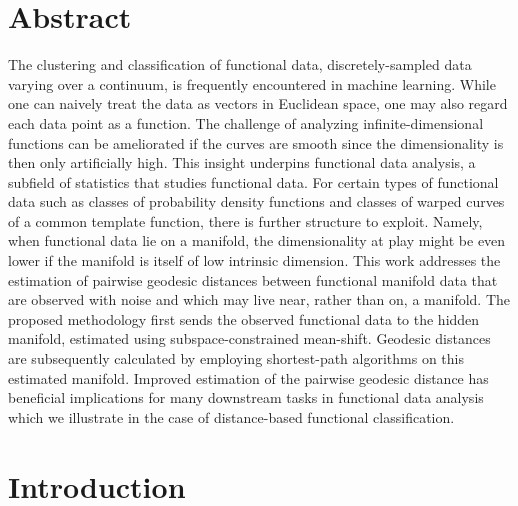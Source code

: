 \newcommand {\To}{\rightarrow}
\newcommand {\TO}{\Rightarrow}
\newcommand {\R}{\mathbb{R}}
\newcommand {\Prob}{\mathbb{P}}
\newcommand{\E}{\mathbb{E}}
\newcommand {\cov}{\textrm{Cov}}
\newcommand {\var}{\textrm{Var}}
\newcommand {\1}{\textrm{\textbf{1}}}
\newcommand{\M}{\mathcal{M}}

\section{Abstract}\label{abstract}

The clustering and classification of functional data, discretely-sampled
data varying over a continuum, is frequently encountered in machine
learning. While one can naively treat the data as vectors in Euclidean
space, one may also regard each data point as a function. The challenge
of analyzing infinite-dimensional functions can be ameliorated if the
curves are smooth since the dimensionality is then only artificially
high. This insight underpins functional data analysis, a subfield of
statistics that studies functional data. For certain types of functional
data such as classes of probability density functions and classes of
warped curves of a common template function, there is further structure
to exploit. Namely, when functional data lie on a manifold, the
dimensionality at play might be even lower if the manifold is itself of
low intrinsic dimension. This work addresses the estimation of pairwise
geodesic distances between functional manifold data that are observed
with noise and which may live near, rather than on, a manifold. The
proposed methodology first sends the observed functional data to the
hidden manifold, estimated using subspace-constrained mean-shift.
Geodesic distances are subsequently calculated by employing
shortest-path algorithms on this estimated manifold. Improved estimation
of the pairwise geodesic distance has beneficial implications for many
downstream tasks in functional data analysis which we illustrate in the
case of distance-based functional classification.

\section{Introduction}\label{introduction}

